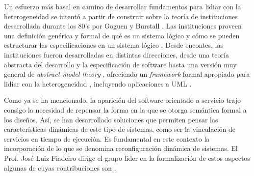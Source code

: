 \documentclass[a4paper, 11pt]{article}
\begin{document}
Un esfuerzo más basal en camino de desarrollar fundamentos para lidiar con la heterogeneidad se intentó a partir de construir sobre la teoría de instituciones desarrollada durante los 80's por Goguen y Burstall \cite{goguen:cmwlp84}. Las instituciones proveen una definición genérica y formal de qué es un sistema lógico y cómo se pueden estructurar las especificaciones en un sistema lógico \cite{sannella:ic-76_2-3}. Desde encontes, las instituciones fueron desarrolladas en distintas direcciones, desde una teoría abstracta del desarrollo y la especificación de software \cite{tarlecki:nato-asimalles03} hasta una versión muy general de \emph{abstract model theory} \cite{diaconescu08}, ofreciendo un \emph{framework} formal apropiado para lidiar con la heterogeneidad \cite{mossakowski:tacas07,tarlecki:gabbay00}, incluyendo aplicaciones a UML \cite{cengarle:cgm08}.

% 
%
Como ya se ha mencionado, la aparición del software orientado a servicio trajo consigo la necesidad de repensar la forma en la que se otorga semántica formal a los diseños. Así, se han desarrollado soluciones que permiten pensar las características dinámicas de este tipo de sistemas, como ser la vinculación de servicios en tiempo de ejecución. Es fundamental en este contexto la incorporación de lo que se denomina reconfiguración dinámica de sistemas. El Prof. José Luiz Fiadeiro dirige el grupo lider en la formalización de estos aspectos algunas de cuyas contribuciones son \cite{fase12, fiadeiro-scp-12-77, fiadeiro-FAC-11-23}.
\end{document}
